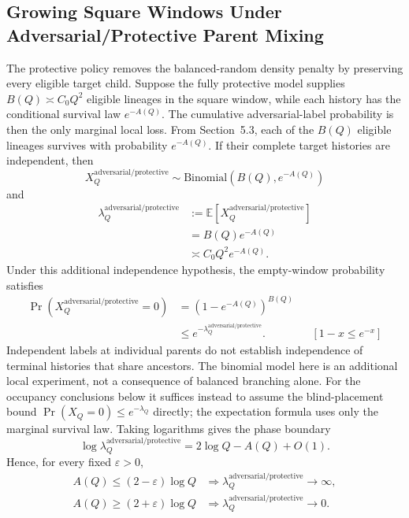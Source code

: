\subsection{Growing Square Windows Under Adversarial/Protective Parent Mixing}
The protective policy removes the balanced-random density penalty by preserving every eligible target child. Suppose the fully protective model supplies $B(Q)\asymp C_0Q^2$ eligible lineages in the square window, while each history has the conditional survival law $e^{-A(Q)}$. The cumulative adversarial-label probability is then the only marginal local loss.
From Section~5.3, each of the $B(Q)$ eligible lineages survives with probability $e^{-A(Q)}$. If their complete target histories are independent, then
\begin{equation*}
X_Q^{\mathrm{adversarial/protective}}
\sim
\text{Binomial}\left(B(Q),e^{-A(Q)}\right)
\end{equation*}
and
\begin{equation*}
\begin{aligned}
\lambda_Q^{\mathrm{adversarial/protective}}
&:=\mathbb E[X_Q^{\mathrm{adversarial/protective}}]\\
&=B(Q)e^{-A(Q)}\\
&\asymp C_0Q^2e^{-A(Q)}.
\end{aligned}
\end{equation*}
Under this additional independence hypothesis, the empty-window probability satisfies
\begin{equation*}
\begin{aligned}
\Pr(X_Q^{\mathrm{adversarial/protective}}=0)
&=\left(1-e^{-A(Q)}\right)^{B(Q)}\\
&\le e^{-\lambda_Q^{\mathrm{adversarial/protective}}}.
&&[1-x\le e^{-x}]
\end{aligned}
\end{equation*}
Independent labels at individual parents do not establish independence of terminal histories that share ancestors. The binomial model here is an additional local experiment, not a consequence of balanced branching alone. For the occupancy conclusions below it suffices instead to assume the blind-placement bound $\Pr(X_Q=0)\le e^{-\lambda_Q}$ directly; the expectation formula uses only the marginal survival law.
Taking logarithms gives the phase boundary
\begin{equation*}
\log\lambda_Q^{\mathrm{adversarial/protective}}
=2\log Q-A(Q)+O(1).
\end{equation*}
Hence, for every fixed $\varepsilon > 0$,
\begin{equation*}
\begin{aligned}
A(Q)\le(2-\varepsilon)\log Q
&\Longrightarrow
\lambda_Q^{\mathrm{adversarial/protective}}\longrightarrow\infty,\\
A(Q)\ge(2+\varepsilon)\log Q
&\Longrightarrow
\lambda_Q^{\mathrm{adversarial/protective}}\longrightarrow0.
\end{aligned}
\end{equation*}
